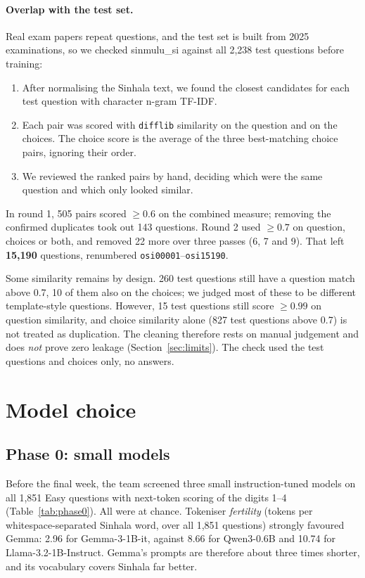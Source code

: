 \documentclass[10pt,a4paper]{article}
\begin{document}
\paragraph{Overlap with the test set.} Real exam papers repeat questions, and the test set is built from 2025
examinations, so we checked sinmulu\_si against all 2,238 test questions before training:
\begin{enumerate}
\item After normalising the Sinhala text, we found the closest candidates for each test question with character
n-gram TF-IDF.
\item Each pair was scored with \texttt{difflib} similarity on the question and on the choices. The choice score is the
average of the three best-matching choice pairs, ignoring their order.
\item We reviewed the ranked pairs by hand, deciding which were the same question and which only looked similar.
\end{enumerate}
In round 1, 505 pairs scored $\ge 0.6$ on the combined measure; removing the confirmed duplicates took out 143
questions. Round 2 used $\ge 0.7$ on question, choices or both, and removed 22 more over three passes (6, 7 and 9).
That left \textbf{15,190} questions, renumbered \texttt{osi00001}--\texttt{osi15190}.

Some similarity remains by design. 260 test questions still have a question match above 0.7, 10 of them also on the
choices; we judged most of these to be different template-style questions. However, 15 test questions still score
$\ge 0.99$ on question similarity, and choice similarity alone (827 test questions above 0.7) is not treated as
duplication. The cleaning therefore rests on manual judgement and does \emph{not} prove zero leakage
(Section~\ref{sec:limits}). The check used the test questions and choices only, no answers.

\section{Model choice}\label{sec:model}
\subsection{Phase 0: small models}
Before the final week, the team screened three small instruction-tuned models on all 1,851 Easy questions with
next-token scoring of the digits 1--4 (Table~\ref{tab:phase0}). All were at chance. Tokeniser \emph{fertility}
(tokens per whitespace-separated Sinhala word, over all 1,851 questions) strongly favoured Gemma: 2.96 for
Gemma-3-1B-it, against 8.66 for Qwen3-0.6B and 10.74 for Llama-3.2-1B-Instruct. Gemma's prompts are therefore about
three times shorter, and its vocabulary covers Sinhala far better.
\end{document}
